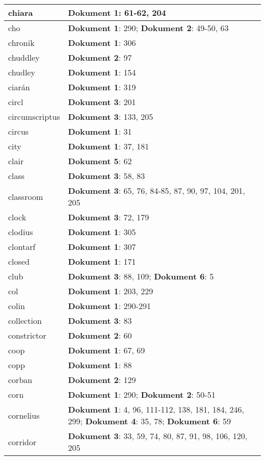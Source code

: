 \documentclass[a5paper]{article}
\begin{document}
\begin{longtable}[l]{|l|p{3in}|}
\hline
chiara & \textbf{Dokument 1}: 61-62, 204 \\
\hline
cho & \textbf{Dokument 1}: 290; \textbf{Dokument 2}: 49-50, 63 \\
\hline
chronik & \textbf{Dokument 1}: 306 \\
\hline
chuddley & \textbf{Dokument 2}: 97 \\
\hline
chudley & \textbf{Dokument 1}: 154 \\
\hline
ciarán & \textbf{Dokument 1}: 319 \\
\hline
circl & \textbf{Dokument 3}: 201 \\
\hline
circumscriptus & \textbf{Dokument 3}: 133, 205 \\
\hline
circus & \textbf{Dokument 1}: 31 \\
\hline
city & \textbf{Dokument 1}: 37, 181 \\
\hline
clair & \textbf{Dokument 5}: 62 \\
\hline
class & \textbf{Dokument 3}: 58, 83 \\
\hline
classroom & \textbf{Dokument 3}: 65, 76, 84-85, 87, 90, 97, 104, 201, 205 \\
\hline
clock & \textbf{Dokument 3}: 72, 179 \\
\hline
clodius & \textbf{Dokument 1}: 305 \\
\hline
clontarf & \textbf{Dokument 1}: 307 \\
\hline
closed & \textbf{Dokument 1}: 171 \\
\hline
club & \textbf{Dokument 3}: 88, 109; \textbf{Dokument 6}: 5 \\
\hline
col & \textbf{Dokument 1}: 203, 229 \\
\hline
colin & \textbf{Dokument 1}: 290-291 \\
\hline
collection & \textbf{Dokument 3}: 83 \\
\hline
constrictor & \textbf{Dokument 2}: 60 \\
\hline
coop & \textbf{Dokument 1}: 67, 69 \\
\hline
copp & \textbf{Dokument 1}: 88 \\
\hline
corban & \textbf{Dokument 2}: 129 \\
\hline
corn & \textbf{Dokument 1}: 290; \textbf{Dokument 2}: 50-51 \\
\hline
cornelius & \textbf{Dokument 1}: 4, 96, 111-112, 138, 181, 184, 246, 299; \textbf{Dokument 4}: 35, 78; \textbf{Dokument 6}: 59 \\
\hline
corridor & \textbf{Dokument 3}: 33, 59, 74, 80, 87, 91, 98, 106, 120, 205 \\

\end{longtable}
\end{document}
